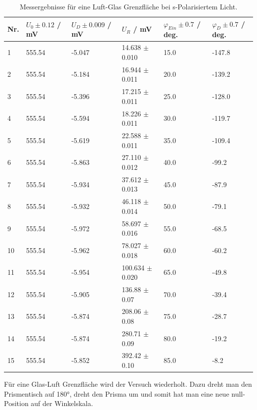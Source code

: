 \documentclass[12pt,a4paper,twoside]{article}
\begin{document}
\begin{table}[H]
    \centering
    \caption{Messergebnisse für eine Luft-Glas Grenzfläche bei s-Polarisiertem Licht. }
    \label{tab:mess luft glas s-pol}
    \begin{tabular}{| l | l | l | l | l | l |}
        \hline
        Nr. & $U_0 \pm 0.12 $ / mV & $U_D \pm 0.009$ / mV & $U_{R}$ / mV & $\varphi_{Ein} \pm 0.7$ / deg. & $\varphi_D \pm 0.7$ / deg.  \\
        \hline
        1  & 555.54 & -5.047 & 14.638  $\pm$ 0.010 & 15.0 & -147.8 \\
        2  & 555.54 & -5.184 & 16.944  $\pm$ 0.011 & 20.0 & -139.2 \\
        3  & 555.54 & -5.396 & 17.215  $\pm$ 0.011 & 25.0 & -128.0 \\
        4  & 555.54 & -5.594 & 18.226  $\pm$ 0.011 & 30.0 & -119.7 \\
        5  & 555.54 & -5.619 & 22.588  $\pm$ 0.011 & 35.0 & -109.4 \\
        6  & 555.54 & -5.863 & 27.110  $\pm$ 0.012 & 40.0 & -99.2  \\
        7  & 555.54 & -5.934 & 37.612  $\pm$ 0.013 & 45.0 & -87.9  \\
        8  & 555.54 & -5.932 & 46.118  $\pm$ 0.014 & 50.0 & -79.1  \\
        9  & 555.54 & -5.972 & 58.697  $\pm$ 0.016 & 55.0 & -68.5  \\
        10 & 555.54 & -5.962 & 78.027  $\pm$ 0.018 & 60.0 & -60.2  \\
        11 & 555.54 & -5.954 & 100.634 $\pm$ 0.020 & 65.0 & -49.8  \\
        12 & 555.54 & -5.905 & 136.88  $\pm$ 0.07 & 70.0 & -39.4  \\
        13 & 555.54 & -5.874 & 208.06  $\pm$ 0.08 & 75.0 & -28.7  \\
        14 & 555.54 & -5.874 & 280.71  $\pm$ 0.09 & 80.0 & -19.2  \\
        15 & 555.54 & -5.852 & 392.42  $\pm$ 0.10 & 85.0 & -8.2   \\
        \hline
    \end{tabular}
\end{table}

\noindent
Für eine Glas-Luft Grenzfläche wird der Versuch wiederholt. Dazu dreht man den Prismentisch auf 180°, dreht den Prisma um und somit hat man eine neue null-Position auf der Winkelskala. 
\end{document}
